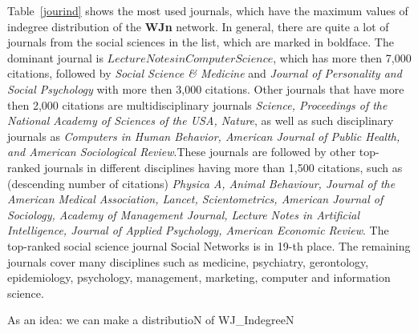 \documentclass[11pt]{article} %
\begin{document}
Table~\ref{jourind} shows the most used journals, which have the maximum values of indegree distribution of the \textbf{WJn} network. In general, there are quite a lot of journals from the social sciences in the list, which are marked in boldface. The dominant journal is $Lecture Notes in Computer Science$, which has more then 7,000 citations, followed by \textit{Social Science \& Medicine} and \textit{Journal of Personality and Social Psychology} with more then 3,000 citations. Other journals that have more then 2,000 citations are multidisciplinary journals \textit{Science, Proceedings of the National Academy of Sciences of the USA, Nature}, as well as  such disciplinary journals as \textit{Computers in Human Behavior, American Journal of Public Health, and American Sociological Review}.These journals are followed by other top-ranked journals in different disciplines having more than 1,500 citations, such as (descending number of citations) \textit{Physica A, Animal Behaviour, Journal of the American Medical Association, Lancet, Scientometrics, American Journal of Sociology, Academy of Management Journal, Lecture Notes in Artificial Intelligence, Journal of Applied Psychology, American Economic Review}. The top-ranked social science journal Social Networks is in 19-th place. The remaining journals cover many disciplines such as  medicine, psychiatry, gerontology, epidemiology, psychology, management, marketing, computer and information science. 

\medskip

As an idea: we can make a distributioN of WJ\_IndegreeN
\end{document}
